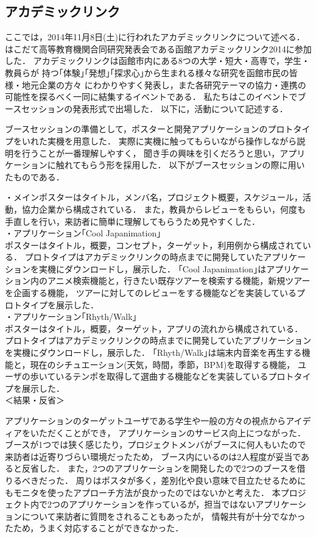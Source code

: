 \subsection{アカデミックリンク}
\par
ここでは，2014年11月8日(土)に行われたアカデミックリンクについて述べる．
はこだて高等教育機関合同研究発表会である函館アカデミックリンク2014に参加した．
アカデミックリンクは函館市内にある8つの大学・短大・高専で，学生・教員らが
持つ｢体験｣｢発想｣｢探求心｣から生まれる様々な研究を函館市民の皆様・地元企業の方々
にわかりやすく発表し，また各研究テーマの協力・連携の可能性を探るべく一同に結集するイベントである．
私たちはこのイベントでブースセッションの発表形式で出場した．
以下に，活動について記述する．
\par
ブースセッションの準備として，ポスターと開発アプリケーションのプロトタイプをいれた実機を用意した．
実際に実機に触ってもらいながら操作しながら説明を行うことが一番理解しやすく，
聞き手の興味を引くだろうと思い，アプリケーションに触れてもらう形を採用した．
以下がブースセッションの際に用いたものである．

\par
・メインポスターはタイトル，メンバ名，プロジェクト概要，スケジュール，活動，協力企業から構成されている．
また，教員からレビューをもらい，何度も手直しを行い，来訪者に簡単に理解してもらうため見やすくした．
\\
・アプリケーション｢Cool Japanimation｣\\
ポスターはタイトル，概要，コンセプト，ターゲット，利用例から構成されている．
プロトタイプはアカデミックリンクの時点までに開発していたアプリケーションを実機にダウンロードし，展示した．
｢Cool Japanimation｣はアプリケーション内のアニメ検索機能と，行きたい既存ツアーを検索する機能，新規ツアーを企画する機能，
ツアーに対してのレビューをする機能などを実装しているプロトタイプを展示した．
\\
・アプリケーション｢Rhyth/Walk｣\\
ポスターはタイトル，概要，ターゲット，アプリの流れから構成されている．
プロトタイプはアカデミックリンクの時点までに開発していたアプリケーションを実機にダウンロードし，展示した．
｢Rhyth/Walk｣は端末内音楽を再生する機能と，現在のシチュエーション(天気，時間，季節，BPM)を取得する機能，
ユーザの歩いているテンポを取得して選曲する機能などを実装しているプロトタイプを展示した．
\\
＜結果・反省＞
\par
アプリケーションのターゲットユーザである学生や一般の方々の視点からアイディアをいただくことができ，
アプリケーションのサービス向上につながった．
ブースが1つでは狭く感じたり，プロジェクトメンバがブースに何人もいたので来訪者は近寄りづらい環境だったため，
ブース内にいるのは2人程度が妥当であると反省した．
また，2つのアプリケーションを開発したので2つのブースを借りるべきだった．
周りはポスタが多く，差別化や良い意味で目立たせるためにもモニタを使ったアプローチ方法が良かったのではないかと考えた．
本プロジェクト内で2つのアプリケーションを作っているが，担当ではないアプリケーションについて来訪者に質問をされることもあったが，
情報共有が十分でなかったため，うまく対応することができなかった．

\par
